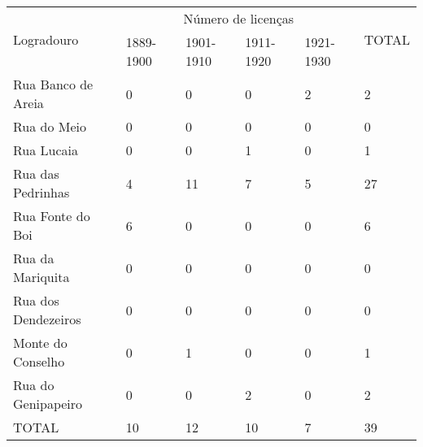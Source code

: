 \begin{table}[!htp]
{
\begin{tiny}
\begin{tabular}{llllll}
\toprule
\multirow{2}{*}{Logradouro}	& \multicolumn{4}{c}{Número de licenças}	& \multirow{2}{*}{TOTAL}\\
\cline{2-5}
	&1889-1900	&1901-1910	&1911-1920	&1921-1930	& \\
\midrule
\midrule
Rua Banco de Areia	&0	&0	&0	&2	&2\\
Rua do Meio	&0	&0	&0	&0	&0\\
Rua Lucaia	&0	&0	&1	&0	&1\\
Rua das Pedrinhas	&4	&11	&7	&5	&27\\
Rua Fonte do Boi	&6	&0	&0	&0	&6\\
Rua da Mariquita	&0	&0	&0	&0	&0\\
Rua dos Dendezeiros	&0	&0	&0	&0	&0\\
Monte do Conselho	&0	&1	&0	&0	&1\\
Rua do Genipapeiro	&0	&0	&2	&0	&2\\
\midrule
TOTAL	&10	&12	&10	&7	&39\\
\bottomrule
\end{tabular} 
\end{tiny}
}
{}
\end{table}
